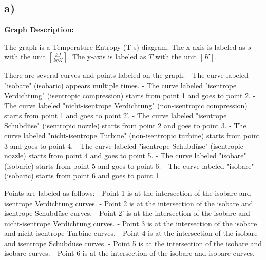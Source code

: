 

\subsection*{a)}

\begin{center}
\textbf{Graph Description:}

The graph is a Temperature-Entropy (T-s) diagram. The x-axis is labeled as $s$ with the unit $\left[\frac{kJ}{kgK}\right]$. The y-axis is labeled as $T$ with the unit $[K]$. 

There are several curves and points labeled on the graph:
- The curve labeled "isobare" (isobaric) appears multiple times.
- The curve labeled "isentrope Verdichtung" (isentropic compression) starts from point 1 and goes to point 2.
- The curve labeled "nicht-isentrope Verdichtung" (non-isentropic compression) starts from point 1 and goes to point 2'.
- The curve labeled "isentrope Schubdüse" (isentropic nozzle) starts from point 2 and goes to point 3.
- The curve labeled "nicht-isentrope Turbine" (non-isentropic turbine) starts from point 3 and goes to point 4.
- The curve labeled "isentrope Schubdüse" (isentropic nozzle) starts from point 4 and goes to point 5.
- The curve labeled "isobare" (isobaric) starts from point 5 and goes to point 6.
- The curve labeled "isobare" (isobaric) starts from point 6 and goes to point 1.

Points are labeled as follows:
- Point 1 is at the intersection of the isobare and isentrope Verdichtung curves.
- Point 2 is at the intersection of the isobare and isentrope Schubdüse curves.
- Point 2' is at the intersection of the isobare and nicht-isentrope Verdichtung curves.
- Point 3 is at the intersection of the isobare and nicht-isentrope Turbine curves.
- Point 4 is at the intersection of the isobare and isentrope Schubdüse curves.
- Point 5 is at the intersection of the isobare and isobare curves.
- Point 6 is at the intersection of the isobare and isobare curves.

\end{center}